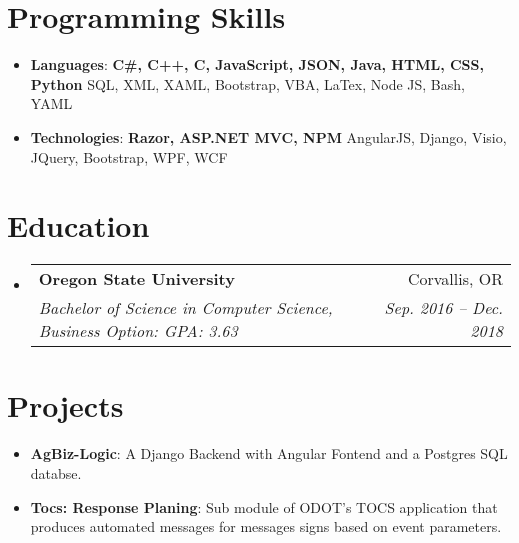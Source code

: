 \documentclass[letterpaper,11pt]{article}
\makeatletter
\newcommand{\resumeItem}[2]{
  \item\small{
    \textbf{#1}{: #2 \vspace{-2pt}}
  }
}
\newcommand{\resumeSubheading}[4]{
  \vspace{-1pt}\item
    \begin{tabular*}{0.97\textwidth}{l@{\extracolsep{\fill}}r}
      \textbf{#1} & #2 \\
      \textit{\small#3} & \textit{\small #4} \\
    \end{tabular*}\vspace{-5pt}
}
\newcommand{\resumeSubItem}[2]{\resumeItem{#1}{#2}\vspace{-4pt}}
\newcommand{\resumeSubHeadingListStart}{\begin{itemize}[leftmargin=*]}
\newcommand{\resumeSubHeadingListEnd}{\end{itemize}}
\makeatother
\begin{document}
\section{Programming Skills}
  \resumeSubHeadingListStart
    \item{
     \textbf{Languages}{: \textbf{C\#, C++, C, JavaScript, JSON, Java, HTML, CSS, Python} SQL, XML, XAML, Bootstrap, VBA, LaTex, Node JS, Bash, YAML}}
     \item{
      \textbf{Technologies}{: \textbf{Razor, ASP.NET MVC, NPM} AngularJS, Django, Visio, JQuery, Bootstrap, WPF, WCF}
    }
  \resumeSubHeadingListEnd

\section{Education}
  \resumeSubHeadingListStart
    \resumeSubheading
      {Oregon State University}{Corvallis, OR}
      {Bachelor of Science in Computer Science, Business Option:  GPA: 3.63}{Sep. 2016 -- Dec. 2018}
  \resumeSubHeadingListEnd

\section{Projects}
  \resumeSubHeadingListStart
    \resumeSubItem{AgBiz-Logic}
      {A Django Backend with Angular Fontend and a Postgres SQL databse.}
    \resumeSubItem{Tocs: Response Planing}
      {Sub module of ODOT's TOCS application that produces automated messages for messages signs based on event parameters.}
  \resumeSubHeadingListEnd
\end{document}
